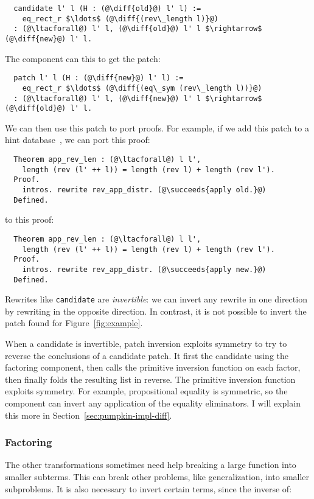 \begin{lstlisting}
  candidate l' l (H : (@\diff{old}@) l' l) :=
    eq_rect_r $\ldots$ (@\diff{(rev\_length l)}@)
  : (@\ltacforall@) l' l, (@\diff{old}@) l' l $\rightarrow$ (@\diff{new}@) l' l.
\end{lstlisting}
The component can  this to get the patch: %

\begin{lstlisting}
  patch l' l (H : (@\diff{new}@) l' l) :=
    eq_rect_r $\ldots$ (@\diff{(eq\_sym (rev\_length l))}@)
  : (@\ltacforall@) l' l, (@\diff{new}@) l' l $\rightarrow$ (@\diff{old}@) l' l.
\end{lstlisting}
We can then use this patch to port proofs.
For example, if we add this patch to a hint database~\cite{hints},
we can port this proof:

\begin{lstlisting}
  Theorem app_rev_len : (@\ltacforall@) l l',
    length (rev (l' ++ l)) = length (rev l) + length (rev l').
  Proof.
    intros. rewrite rev_app_distr. (@\succeeds{apply old.}@)
  Defined.
\end{lstlisting}
to this proof:

\begin{lstlisting}
  Theorem app_rev_len : (@\ltacforall@) l l',
    length (rev (l' ++ l)) = length (rev l) + length (rev l').
  Proof.
    intros. rewrite rev_app_distr. (@\succeeds{apply new.}@)
  Defined.
\end{lstlisting}

Rewrites like \lstinline{candidate} are \textit{invertible}:
we can invert any rewrite in one direction by rewriting in the opposite direction.
In contrast, it is not possible to invert the patch \sysname
found for Figure~\ref{fig:example}.

When a candidate is invertible, patch inversion exploits symmetry to try to reverse the conclusions of a candidate patch.
It first  the candidate using the factoring component, then calls the primitive inversion
function on each factor, then finally folds the resulting list in reverse.
The primitive inversion function exploits symmetry. 
For example, propositional equality is symmetric, so the component can invert any application of the equality eliminators.
I will explain this more in Section~\ref{sec:pumpkin-impl-diff}.

\subsubsection*{Factoring} The other transformations sometimes need help breaking a large function into smaller subterms.
This can break other problems, like generalization, into smaller subproblems.
It is also necessary to invert certain terms, since the inverse of:

